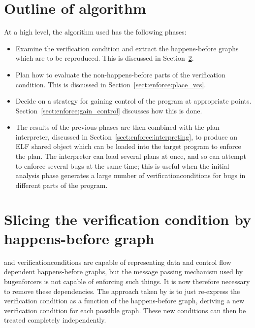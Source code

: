 \section{Outline of algorithm}

At a high level, the algorithm used has the following phases:

\begin{itemize}
\item
  Examine the verification condition and extract the happens-before
  graphs which are to be reproduced.  This is discussed in
  Section~\ref{sect:enforce:slice_hb_graph}.
\item
  Plan how to evaluate the non-happens-before parts of the
  verification condition.  This is discussed in
  Section~\ref{sect:enforce:place_vcs}.
\item
  Decide on a strategy for gaining control of the program at
  appropriate points.  Section~\ref{sect:enforce:gain_control}
  discusses how this is done.
\item
  The results of the previous phases are then combined with the plan
  interpreter, discussed in Section~\ref{sect:enforce:interpreting},
  to produce an ELF shared object which can be loaded into the target
  program to enforce the plan.  The interpreter can load several plans
  at once, and so can attempt to enforce several bugs at the same
  time; this is useful when the initial analysis phase generates a
  large number of \glspl{verificationcondition} for bugs in different
  parts of the program.
\end{itemize}

\section{Slicing the verification condition by happens-before graph}
\label{sect:enforce:slice_hb_graph}


{\STateMachines} and \glspl{verificationcondition} are capable of
representing data and control flow dependent happens-before graphs,
but the message passing mechanism used by \glspl{bugenforcer} is not
capable of enforcing such things.  It is now therefore necessary to
remove these dependencies.  The approach taken by {\implementation} is
to just re-express the verification condition as a function of the
happens-before graph, deriving a new verification condition for each
possible graph.  These new conditions can then be treated completely
independently.

